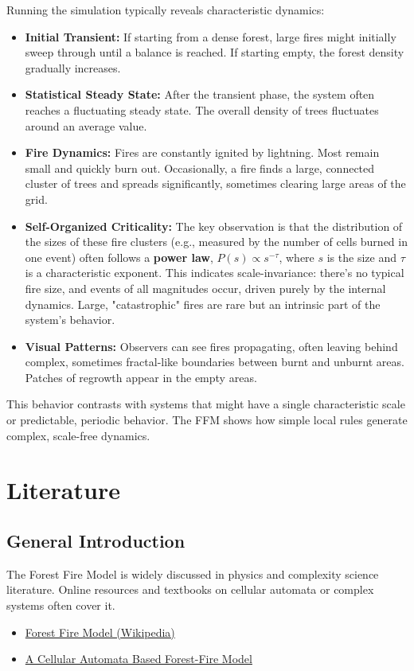 \documentclass{article}
\begin{document}
Running the simulation typically reveals characteristic dynamics:
\begin{itemize}
\item \textbf{Initial Transient:} If starting from a dense forest, large fires might initially sweep through until a balance is reached. If starting empty, the forest density gradually increases.
\item \textbf{Statistical Steady State:} After the transient phase, the system often reaches a fluctuating steady state. The overall density of trees fluctuates around an average value.
\item \textbf{Fire Dynamics:} Fires are constantly ignited by lightning. Most remain small and quickly burn out. Occasionally, a fire finds a large, connected cluster of trees and spreads significantly, sometimes clearing large areas of the grid.
\item \textbf{Self-Organized Criticality:} The key observation is that the distribution of the sizes of these fire clusters (e.g., measured by the number of cells burned in one event) often follows a \textbf{power law}, $P(s) \propto s^{-\tau}$, where $s$ is the size and $\tau$ is a characteristic exponent. This indicates scale-invariance: there's no typical fire size, and events of all magnitudes occur, driven purely by the internal dynamics. Large, "catastrophic" fires are rare but an intrinsic part of the system's behavior.
\item \textbf{Visual Patterns:} Observers can see fires propagating, often leaving behind complex, sometimes fractal-like boundaries between burnt and unburnt areas. Patches of regrowth appear in the empty areas.
\end{itemize}
This behavior contrasts with systems that might have a single characteristic scale or predictable, periodic behavior. The FFM shows how simple local rules generate complex, scale-free dynamics.

\section{Literature}
\subsection{General Introduction}
The Forest Fire Model is widely discussed in physics and complexity science literature. Online resources and textbooks on cellular automata or complex systems often cover it.
\begin{itemize}
\item \href{https://en.wikipedia.org/wiki/Forest-fire_model}{Forest Fire Model (Wikipedia)}
\item \href{https://itp.uni-frankfurt.de/~gros/StudentProjects/Projects_2020/projekt_lars_dingeldein/}{A Cellular Automata Based Forest-Fire Model}
\end{itemize}
\end{document}
